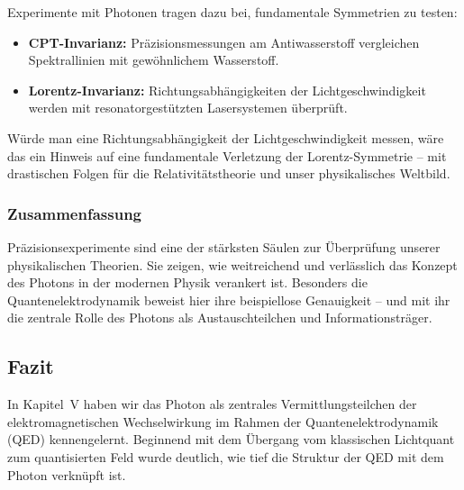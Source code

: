 Experimente mit Photonen tragen dazu bei, fundamentale Symmetrien zu testen:

\begin{itemize}
	\item \textbf{CPT-Invarianz:} Präzisionsmessungen am Antiwasserstoff vergleichen Spektrallinien mit gewöhnlichem Wasserstoff.
	\item \textbf{Lorentz-Invarianz:} Richtungsabhängigkeiten der Lichtgeschwindigkeit werden mit resonatorgestützten Lasersystemen überprüft.
\end{itemize}
\vspace{0.5em}
\begin{tcolorbox}[hypobox, title={Was wäre, wenn Licht nicht isotrop wäre?}]
	\label{box:was wäre nicht isotop}
	
	Würde man eine Richtungsabhängigkeit der Lichtgeschwindigkeit messen, wäre das ein Hinweis auf eine fundamentale Verletzung der Lorentz-Symmetrie – mit drastischen Folgen für die Relativitätstheorie und unser physikalisches Weltbild.
\end{tcolorbox}

\subsubsection{Zusammenfassung}

Präzisionsexperimente sind eine der stärksten Säulen zur Überprüfung unserer physikalischen Theorien. Sie zeigen, wie weitreichend und verlässlich das Konzept des Photons in der modernen Physik verankert ist. Besonders die Quantenelektrodynamik beweist hier ihre beispiellose Genauigkeit – und mit ihr die zentrale Rolle des Photons als Austauschteilchen und Informationsträger.

\subsection{Fazit}

In Kapitel~V haben wir das Photon als zentrales Vermittlungsteilchen der elektromagnetischen Wechselwirkung im Rahmen der Quantenelektrodynamik (QED) kennengelernt. Beginnend mit dem Übergang vom klassischen Lichtquant zum quantisierten Feld wurde deutlich, wie tief die Struktur der QED mit dem Photon verknüpft ist. 

